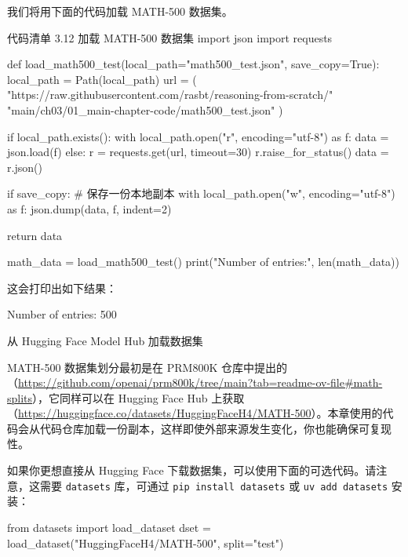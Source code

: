 我们将用下面的代码加载 MATH-500 数据集。

\begin{codeboxt}{代码清单 3.12 加载 MATH-500 数据集}
import json
import requests

def load_math500_test(local_path="math500_test.json", save_copy=True):
    local_path = Path(local_path)
    url = (
        "https://raw.githubusercontent.com/rasbt/reasoning-from-scratch/"
        "main/ch03/01_main-chapter-code/math500_test.json"
    )

    if local_path.exists():
        with local_path.open("r", encoding="utf-8") as f:
            data = json.load(f)
    else:
        r = requests.get(url, timeout=30)
        r.raise_for_status()
        data = r.json()

        if save_copy:  # 保存一份本地副本
            with local_path.open("w", encoding="utf-8") as f:
                json.dump(data, f, indent=2)

    return data

math_data = load_math500_test()
print("Number of entries:", len(math_data))
\end{codeboxt}

这会打印出如下结果：

\begin{codebox}
Number of entries: 500
\end{codebox}

\begin{mySidebar}{从 Hugging Face Model Hub 加载数据集}

MATH-500 数据集划分最初是在 PRM800K 仓库中提出的（\href{https://github.com/openai/prm800k/tree/main?tab=readme-ov-file\#math-splits}{https://github.com/openai/prm800k/tree/main?tab=readme-ov-file\#math-splits}），它同样可以在 Hugging Face Hub 上获取（\href{https://huggingface.co/datasets/HuggingFaceH4/MATH-500}{https://huggingface.co/datasets/­HuggingFaceH4/MATH-500}）。本章使用的代码会从代码仓库加载一份副本，这样即使外部来源发生变化，你也能确保可复现性。

如果你更想直接从 Hugging Face 下载数据集，可以使用下面的可选代码。请注意，这需要 \texttt{datasets} 库，可通过 \texttt{pip install datasets} 或 \texttt{uv add datasets} 安装：

\begin{codebox}
from datasets import load_dataset
dset = load_dataset("HuggingFaceH4/MATH-500", split="test")
\end{codebox}

\end{mySidebar}

